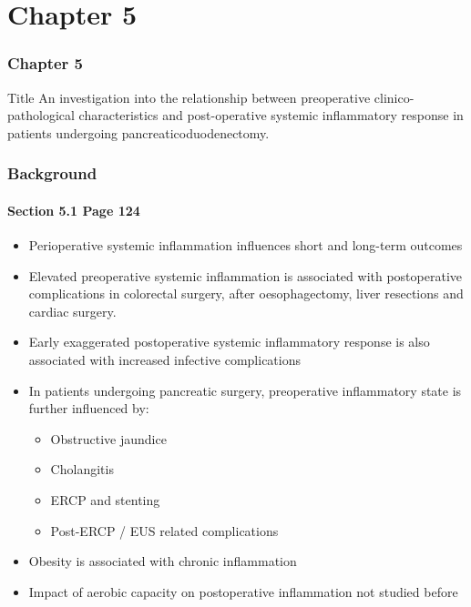\documentclass[10pt]{beamer}
\begin{document}
\section{Chapter 5}

\begin{frame}
	\frametitle{Chapter 5}
	\begin{block}{Title}
		An investigation into the relationship between preoperative clinico-pathological characteristics and post-operative systemic inflammatory response in patients undergoing pancreaticoduodenectomy.
	\end{block}
\end{frame}

\begin{frame}
	\frametitle{Background}
	\framesubtitle{Section 5.1 Page 124}
	\begin{itemize}
		\item Perioperative systemic inflammation influences short and long-term outcomes
		\item Elevated preoperative systemic inflammation is associated with postoperative complications in colorectal surgery, after oesophagectomy, liver resections and cardiac surgery. 
		\item Early exaggerated postoperative systemic inflammatory response is also associated with increased infective complications
		\item In patients undergoing pancreatic surgery, preoperative inflammatory state is further influenced by:
		\begin{itemize}
			\item Obstructive jaundice
			\item Cholangitis
			\item ERCP and stenting
			\item Post-ERCP / EUS related complications
		\end{itemize}
		\item Obesity is associated with chronic inflammation
		\item Impact of aerobic capacity on postoperative inflammation not studied before
	\end{itemize}
\end{frame}
\end{document}
